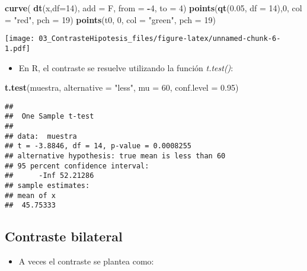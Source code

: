 \documentclass[]{article}
\newenvironment{Shaded}{\begin{snugshade}}{\end{snugshade}}
\newcommand{\KeywordTok}[1]{\textcolor[rgb]{0.13,0.29,0.53}{\textbf{#1}}}
\newcommand{\DataTypeTok}[1]{\textcolor[rgb]{0.13,0.29,0.53}{#1}}
\newcommand{\DecValTok}[1]{\textcolor[rgb]{0.00,0.00,0.81}{#1}}
\newcommand{\FloatTok}[1]{\textcolor[rgb]{0.00,0.00,0.81}{#1}}
\newcommand{\StringTok}[1]{\textcolor[rgb]{0.31,0.60,0.02}{#1}}
\newcommand{\OperatorTok}[1]{\textcolor[rgb]{0.81,0.36,0.00}{\textbf{#1}}}
\newcommand{\NormalTok}[1]{#1}
\providecommand{\tightlist}{%
  \setlength{\itemsep}{0pt}\setlength{\parskip}{0pt}}
\begin{document}
\begin{Shaded}
\begin{Highlighting}[]
\KeywordTok{curve}\NormalTok{( }\KeywordTok{dt}\NormalTok{(x,}\DataTypeTok{df=}\DecValTok{14}\NormalTok{), }\DataTypeTok{add =}\NormalTok{ F, }\DataTypeTok{from =} \OperatorTok{-}\DecValTok{4}\NormalTok{, }\DataTypeTok{to =} \DecValTok{4}\NormalTok{)}
\KeywordTok{points}\NormalTok{(}\KeywordTok{qt}\NormalTok{(}\FloatTok{0.05}\NormalTok{, }\DataTypeTok{df =} \DecValTok{14}\NormalTok{),}\DecValTok{0}\NormalTok{, }\DataTypeTok{col =} \StringTok{"red"}\NormalTok{, }\DataTypeTok{pch =} \DecValTok{19}\NormalTok{)}
\KeywordTok{points}\NormalTok{(t0, }\DecValTok{0}\NormalTok{, }\DataTypeTok{col =} \StringTok{"green"}\NormalTok{, }\DataTypeTok{pch =} \DecValTok{19}\NormalTok{)}
\end{Highlighting}
\end{Shaded}

\texttt{[image: 03\_ContrasteHipotesis\_files/figure-latex/unnamed-chunk-6-1.pdf]}

\begin{itemize}
\tightlist
\item
  En R, el contraste se resuelve utilizando la función \emph{t.test()}:
\end{itemize}

\begin{Shaded}
\begin{Highlighting}[]
\KeywordTok{t.test}\NormalTok{(muestra, }\DataTypeTok{alternative =} \StringTok{"less"}\NormalTok{, }\DataTypeTok{mu =} \DecValTok{60}\NormalTok{, }\DataTypeTok{conf.level =} \FloatTok{0.95}\NormalTok{)}
\end{Highlighting}
\end{Shaded}

\begin{verbatim}
## 
##  One Sample t-test
## 
## data:  muestra
## t = -3.8846, df = 14, p-value = 0.0008255
## alternative hypothesis: true mean is less than 60
## 95 percent confidence interval:
##      -Inf 52.21286
## sample estimates:
## mean of x 
##  45.75333
\end{verbatim}

\subsection{Contraste bilateral}\label{contraste-bilateral}

\begin{itemize}
\tightlist
\item
  A veces el contraste se plantea como:
\end{itemize}
\end{document}
